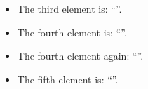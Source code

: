\documentclass{article}
\newcommand{\fourthelement}{\getnthelement{4}}
\begin{document}

\begin{itemize}
\item The third element is: ``''.
\item The fourth element is: ``\fourthelement''.
\item The fourth element again: ``\fourthelement''.
\item The fifth element is: ``''.
\end{itemize}


\texttt{\meaning\playaroundelement}
\end{document}

